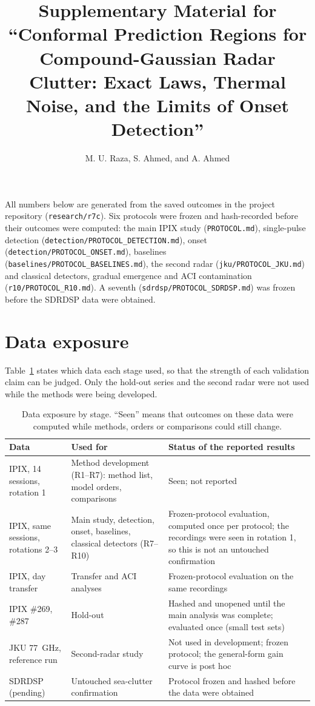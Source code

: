 \documentclass[10pt]{article}
\title{Supplementary Material for ``Conformal Prediction Regions for Compound-Gaussian Radar Clutter: Exact Laws, Thermal Noise, and the Limits of Onset Detection''}
\author{M. U. Raza, S. Ahmed, and A. Ahmed}
\date{}
\begin{document}
\maketitle
\noindent All numbers below are generated from the saved outcomes in the project repository (\texttt{research/r7c}). Six protocols were frozen and hash-recorded before their outcomes were computed: the main IPIX study (\texttt{PROTOCOL.md}), single-pulse detection (\texttt{detection/PROTOCOL\_DETECTION.md}), onset (\texttt{detection/PROTOCOL\_ONSET.md}), baselines (\texttt{baselines/PROTOCOL\_BASELINES.md}), the second radar (\texttt{jku/PROTOCOL\_JKU.md}) and classical detectors, gradual emergence and ACI contamination (\texttt{r10/PROTOCOL\_R10.md}). A seventh (\texttt{sdrdsp/PROTOCOL\_SDRDSP.md}) was frozen before the SDRDSP data were obtained.

\section{Data exposure}
Table~\ref{tab:exposure} states which data each stage used, so that the strength of each validation claim can be judged. Only the hold-out series and the second radar were not used while the methods were being developed.
\begin{table}[h]
\centering\small
\caption{Data exposure by stage. ``Seen'' means that outcomes on these data were computed while methods, orders or comparisons could still change.}
\label{tab:exposure}
\begin{tabular}{p{4.3cm}p{5.2cm}p{6.2cm}}
\toprule
Data & Used for & Status of the reported results\\
\midrule
IPIX, 14 sessions, rotation 1 & Method development (R1--R7): method list, model orders, comparisons & Seen; not reported\\
IPIX, same sessions, rotations 2--3 & Main study, detection, onset, baselines, classical detectors (R7--R10) & Frozen-protocol evaluation, computed once per protocol; the recordings were seen in rotation 1, so this is not an untouched confirmation\\
IPIX, day transfer & Transfer and ACI analyses & Frozen-protocol evaluation on the same recordings\\
IPIX \#269, \#287 & Hold-out & Hashed and unopened until the main analysis was complete; evaluated once (small test sets)\\
JKU 77~GHz, reference run & Second-radar study & Not used in development; frozen protocol; the general-form gain curve is post hoc\\
SDRDSP (pending) & Untouched sea-clutter confirmation & Protocol frozen and hashed before the data were obtained\\
\bottomrule
\end{tabular}
\end{table}
\end{document}
